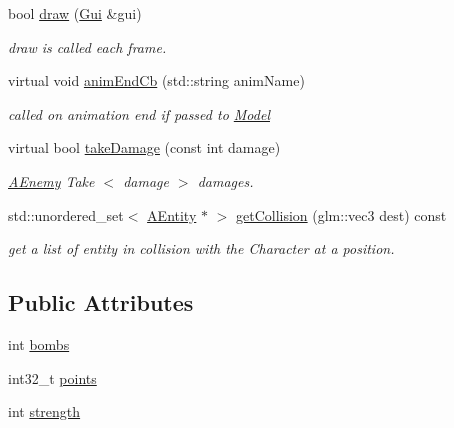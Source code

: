 \begin{DoxyCompactItemize}
bool \hyperlink{class_a_enemy_a527fc4b7bb46c04c486fd025a01e16a9}{draw} (\hyperlink{class_gui}{Gui} \&gui)
\begin{DoxyCompactList}\small\item\em draw is called each frame. \end{DoxyCompactList}\item 
virtual void \hyperlink{class_a_enemy_ac946b6cd7d96f99365301450566d3baf}{anim\+End\+Cb} (std\+::string anim\+Name)
\begin{DoxyCompactList}\small\item\em called on animation end if passed to \hyperlink{class_model}{Model} \end{DoxyCompactList}\item 
virtual bool \hyperlink{class_a_enemy_a17bcf116c42c3d780e243127adf1a947}{take\+Damage} (const int damage)
\begin{DoxyCompactList}\small\item\em \hyperlink{class_a_enemy}{A\+Enemy} Take $<$ damage $>$ damages. \end{DoxyCompactList}\item 
std\+::unordered\+\_\+set$<$ \hyperlink{class_a_entity}{A\+Entity} $\ast$ $>$ \hyperlink{class_a_enemy_aca840427bf701f3c24b38a4c17a14cfd}{get\+Collision} (glm\+::vec3 dest) const
\begin{DoxyCompactList}\small\item\em get a list of entity in collision with the Character at a position. \end{DoxyCompactList}\end{DoxyCompactItemize}
\subsection*{Public Attributes}
\begin{DoxyCompactItemize}
\item 
int \hyperlink{class_a_enemy_ac306e77e93cd7574766e04d17728d18a}{bombs}
\item 
int32\+\_\+t \hyperlink{class_a_enemy_a0d6c03c5f76b67b821f2510cc12dfc64}{points}
\item 
int \hyperlink{class_a_enemy_ac1bb9d347e62e478c9c83be27dcf1598}{strength}
\end{DoxyCompactItemize}
